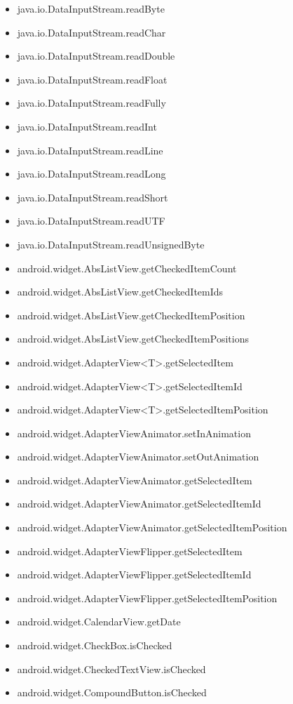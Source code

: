 \documentclass{sig-alternate}
\begin{document}
\begin{itemize}
\item java.io.DataInputStream.readByte
\item java.io.DataInputStream.readChar
\item java.io.DataInputStream.readDouble
\item java.io.DataInputStream.readFloat
\item java.io.DataInputStream.readFully
\item java.io.DataInputStream.readInt
\item java.io.DataInputStream.readLine
\item java.io.DataInputStream.readLong
\item java.io.DataInputStream.readShort
\item java.io.DataInputStream.readUTF
\item java.io.DataInputStream.readUnsignedByte
\item android.widget.AbsListView.getCheckedItemCount
\item android.widget.AbsListView.getCheckedItemIds
\item android.widget.AbsListView.getCheckedItemPosition
\item android.widget.AbsListView.getCheckedItemPositions
\item android.widget.AdapterView<T>.getSelectedItem
\item android.widget.AdapterView<T>.getSelectedItemId
\item android.widget.AdapterView<T>.getSelectedItemPosition
\item android.widget.AdapterViewAnimator.setInAnimation
\item android.widget.AdapterViewAnimator.setOutAnimation
\item android.widget.AdapterViewAnimator.getSelectedItem
\item android.widget.AdapterViewAnimator.getSelectedItemId
\item android.widget.AdapterViewAnimator.getSelectedItemPosition
\item android.widget.AdapterViewFlipper.getSelectedItem
\item android.widget.AdapterViewFlipper.getSelectedItemId
\item android.widget.AdapterViewFlipper.getSelectedItemPosition
\item android.widget.CalendarView.getDate
\item android.widget.CheckBox.isChecked
\item android.widget.CheckedTextView.isChecked
\item android.widget.CompoundButton.isChecked

\end{itemize}
\end{document}
